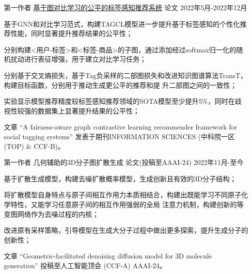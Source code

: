 \begin{cventries}

\cventry
{第一作者} %
{\href{https://www.sciencedirect.com/science/article/pii/S0020025523006497}{基于图对比学习的公平的标签感知推荐系统}} %
{论文} %
{2022年5月-2022年12月} %
{
  \begin{cvitems} %
    \item {基于GNN和对比学习范式，构建TAGCL模型进一步提升基于标签感知的个性化推荐性能，同时显著提升推荐结果的公平性；}
    \item {分别构建<用户-标签>和<标签-商品>的子图，通过添加经过softmax归一化的随机扰动进行表征增强，用于建立对比学习任务；}
    \item {分别基于交叉熵损失，基于Tag负采样的二部图损失和改进知识图谱算法TransT，构建目标函数，分别用于推动生成更公平的推荐和提
    升二部图之间的一致性；}
    \item {实验显示模型推荐精度较标签感知推荐领域的SOTA模型至少提升5\%，同时在歧视性较强的数据集上显著提升结果的公平性；}
    \item {文章 “A fairness-aware graph contrastive learning recommender framework for social tagging systems” 发表于期刊INFORMATION SCIENCES (中科院一区(TOP) \& CCF-B)。}   
  \end{cvitems}
}
  
\cventry
{第一作者} %
{几何辅助的3D分子图扩散生成} %
{论文(投稿至AAAI-24)} %
{2022年11月-至今} %
{
  \begin{cvitems} 
    \item {基于扩散生成模型，构建去噪扩散概率模型，生成创新且有效的3D分子结构；}
    \item {将扩散模型自身特点与原子间相互作用力本质相结合，构建出既能学习不同原子化学特性，又能学习任意原子间的相互作用强弱的全局
    注意力机制，构建创新的等变图网络作为去噪过程的内核；}
    \item {改进原有采样策略，引导模型在生成大分子过程中做出更多探索，提升生成分子的创新性；}
    \item {文章 “Geometric-facilitated denoising diffusion model for 3D molecule generation” 投稿至人工智能顶会 (CCF-A) AAAI-24。}
  \end{cvitems}
}


\end{cventries}
